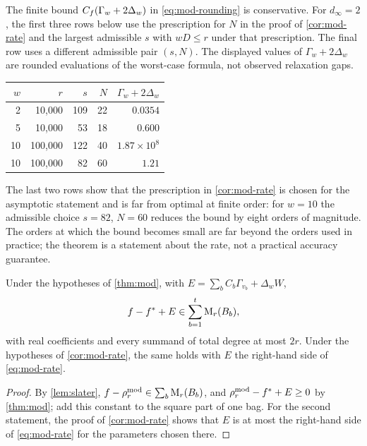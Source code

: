 \begin{remark}\label{rem:calibration}
The finite bound $C_f(\Gamma_w+2\Delta_w)$ in \eqref{eq:mod-rounding} is
conservative. For $d_\infty=2$, the first three rows below use the
prescription for $N$ in the proof of \cref{cor:mod-rate} and the largest
admissible $s$ with $wD\le r$ under that prescription. The final row uses
a different admissible pair $(s,N)$. The displayed values of
$\Gamma_w+2\Delta_w$ are rounded evaluations of the worst-case formula,
not observed relaxation gaps.
\begin{center}
\begin{tabular}{@{}rrrrr@{}}
\toprule
$w$ & $r$ & $s$ & $N$ & $\Gamma_w+2\Delta_w$\\
\midrule
2 & 10{,}000 & 109 & 22 & $0.0354$\\
5 & 10{,}000 & 53 & 18 & $0.600$\\
10 & 100{,}000 & 122 & 40 & $1.87\times10^{8}$\\
10 & 100{,}000 & 82 & 60 & $1.21$\\
\bottomrule
\end{tabular}
\end{center}
The last two rows show that the prescription in \cref{cor:mod-rate} is
chosen for the asymptotic statement and is far from optimal at finite
order: for $w=10$ the admissible choice $s=82$, $N=60$ reduces the bound by
eight orders of magnitude. The orders at which the bound becomes small are
far beyond the orders used in practice; the theorem is a statement about
the rate, not a practical accuracy guarantee.
\end{remark}

\begin{corollary}\label{cor:mod-certificate}
Under the hypotheses of \cref{thm:mod}, with
$E=\sum_bC_b\Gamma_{v_b}+\Delta_wW$,
\[
  f-f^{*}+E\in\sum_{b=1}^t\mathrm{M}_r(B_b),
\]
with real coefficients and every summand of total degree at most $2r$.
Under the hypotheses of \cref{cor:mod-rate}, the same holds with $E$ the
right-hand side of \eqref{eq:mod-rate}.
\end{corollary}

\begin{proof}
By \cref{lem:slater}, $f-\rho^{\mathrm{mod}}_r\in\sum_b\mathrm{M}_r(B_b)$, and
$\rho^{\mathrm{mod}}_r-f^{*}+E\ge0$ by \cref{thm:mod}; add this constant to the
square part of one bag. For the second statement, the proof of
\cref{cor:mod-rate} shows that $E$ is at most the right-hand side of
\eqref{eq:mod-rate} for the parameters chosen there.
\end{proof}

